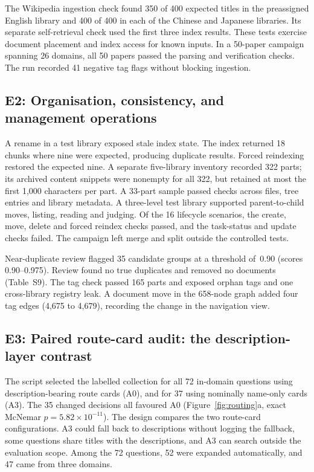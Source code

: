 The Wikipedia ingestion check found 350 of 400 expected titles in the
preassigned English library and 400 of 400 in each of the Chinese and
Japanese libraries. Its separate self-retrieval check used the first
three index results. These tests exercise document placement and
index access for known inputs. In a 50-paper campaign spanning 26
domains, all 50 papers passed the parsing and verification checks.
The run recorded 41 negative tag flags without blocking ingestion.

\subsection{E2: Organisation, consistency, and management operations}
\label{sec:e2}
A rename in a test library exposed stale index state. The index returned
18 chunks where nine were expected, producing duplicate results. Forced
reindexing restored the expected nine. A separate five-library inventory
recorded 322 parts; its archived content snippets were nonempty for all
322, but retained at most the first 1,000 characters per part. A 33-part
sample passed checks across files, tree entries and
library metadata. A three-level
test library supported parent-to-child moves, listing, reading and
judging. Of the 16 lifecycle scenarios, the create, move, delete and
forced reindex checks passed, and the task-status and update checks
failed. The campaign left merge and split outside the controlled tests.

Near-duplicate review flagged 35 candidate groups at a threshold of~0.90
(scores 0.90--0.975). Review found no true duplicates and removed no
documents (Table~S9). The tag check passed 165 parts and exposed orphan
tags and one cross-library registry leak. A document move in the 658-node
graph added four tag edges (4,675 to 4,679), recording the change in the
navigation view.

\subsection{E3: Paired route-card audit: the description-layer contrast}
\label{sec:routing-audit}
The script selected the labelled collection for all 72 in-domain
questions using description-bearing route cards (A0), and for 37 using
nominally name-only cards (A3). The 35 changed decisions all favoured A0
(Figure~\ref{fig:routing}a, exact McNemar $p=5.82\times10^{-11}$). The
design compares the two route-card configurations. A3 could fall back
to descriptions without logging the fallback, some questions share
titles with the descriptions, and A3 can search outside the evaluation
scope. Among the 72 questions, 52 were expanded automatically, and
47 came from three domains.

